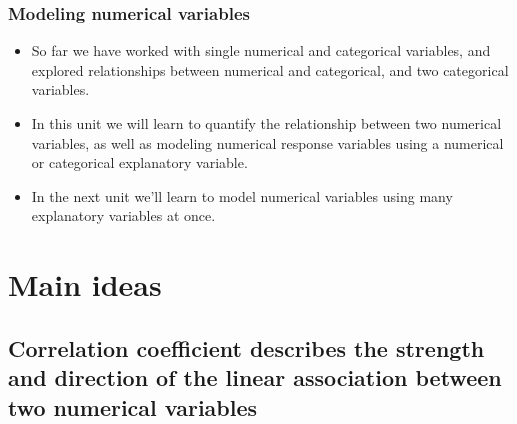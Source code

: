 \documentclass[slidestop,compress,mathserif,12pt,t,professionalfonts,xcolor=table]{beamer}
\begin{document}
\begin{frame}
\frametitle{Modeling numerical variables}

\begin{itemize}

\item So far we have worked with single numerical and categorical variables, and explored relationships between numerical and categorical, and two categorical variables.

\item In this unit we will learn to quantify the relationship between two numerical variables, as well as modeling numerical response variables using a numerical or categorical explanatory variable.

\item In the next unit we'll learn to model numerical variables using many explanatory variables at once.

\end{itemize}

\end{frame}


\section{Main ideas}


\subsection{Correlation coefficient describes the strength and direction of the linear association between two numerical variables}
\label{mi1}

\end{document}
